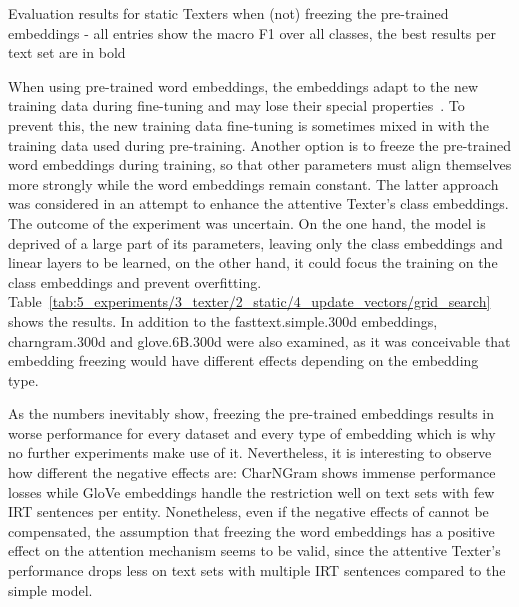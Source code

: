 \begin{table}
    \centering
    
    \caption{Evaluation results for static Texters when (not) freezing the pre-trained embeddings - all entries show the macro F1 over all classes, the best results per text set are in bold}
    \label{tab:5_experiments/3_texter/2_static/4_update_vectors/grid_search}
\end{table}

When using pre-trained word embeddings, the embeddings adapt to the new training data during fine-tuning and may lose their special properties~\cite{He2019AnalyzingTF}. To prevent this, the new training data fine-tuning is sometimes mixed in with the training data used during pre-training. Another option is to freeze the pre-trained word embeddings during training, so that other parameters must align themselves more strongly while the word embeddings remain constant. The latter approach was considered in an attempt to enhance the attentive Texter's class embeddings. The outcome of the experiment was uncertain. On the one hand, the model is deprived of a large part of its parameters, leaving only the class embeddings and linear layers to be learned, on the other hand, it could focus the training on the class embeddings and prevent overfitting. Table~\ref{tab:5_experiments/3_texter/2_static/4_update_vectors/grid_search} shows the results. In addition to the fasttext.simple.300d embeddings, charngram.300d and glove.6B.300d were also examined, as it was conceivable that embedding freezing would have different effects depending on the embedding type.

As the numbers inevitably show, freezing the pre-trained embeddings results in worse performance for every dataset and every type of embedding which is why no further experiments make use of it. Nevertheless, it is interesting to observe how different the negative effects are: CharNGram shows immense performance losses while GloVe embeddings handle the restriction well on text sets with few IRT sentences per entity. Nonetheless, even if the negative effects of cannot be compensated, the assumption that freezing the word embeddings has a positive effect on the attention mechanism seems to be valid, since the attentive Texter's performance drops less on text sets with multiple IRT sentences compared to the simple model.

